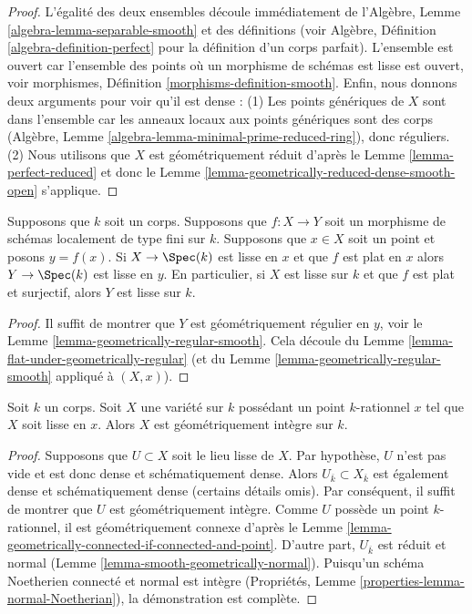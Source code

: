 \begin{proof}
L'égalité des deux ensembles découle immédiatement de
l'Algèbre, Lemme \ref{algebra-lemma-separable-smooth} et des
définitions (voir Algèbre, Définition
\ref{algebra-definition-perfect} pour la définition d'un corps
parfait). L'ensemble est ouvert car l'ensemble des points où un
morphisme de schémas est lisse est ouvert, voir morphismes,
Définition \ref{morphisms-definition-smooth}. Enfin, nous donnons
deux arguments pour voir qu'il est dense : (1) Les points génériques
de $X$ sont dans l'ensemble car les anneaux locaux aux points
génériques sont des corps (Algèbre, Lemme
\ref{algebra-lemma-minimal-prime-reduced-ring}), donc réguliers. (2) Nous
utilisons que $X$ est géométriquement réduit d'après le Lemme
\ref{lemma-perfect-reduced} et donc le Lemme \ref{lemma-geometrically-reduced-dense-smooth-open} s'applique.
\end{proof}

\begin{lemma}
\label{lemma-flat-under-smooth}
Supposons que $k$ soit un corps. Supposons que $f : X \to Y$ soit un morphisme
de schémas localement de type fini sur $k$. Supposons que $x \in X$ soit un
point et posons $y = f(x)$. Si $X \to \Spec(k)$ est lisse en $x$ et que $f$ est
plat en $x$ alors $Y \to \Spec(k)$ est lisse en $y$. En particulier, si $X$
est lisse sur $k$ et que $f$ est plat et surjectif, alors $Y$ est lisse sur $k$.
\end{lemma}

\begin{proof}
Il suffit de montrer que $Y$ est
géométriquement régulier en $y$, voir
le Lemme
\ref{lemma-geometrically-regular-smooth}. Cela
découle du Lemme
\ref{lemma-flat-under-geometrically-regular} (et du Lemme
\ref{lemma-geometrically-regular-smooth} appliqué à $(X, x)$).
\end{proof}

\begin{lemma}
\label{lemma-variety-with-smooth-rational-point}
Soit $k$ un corps. Soit $X$ une variété sur $k$
possédant un point $k$-rationnel $x$ tel que $X$ soit
lisse en $x$. Alors $X$ est géométriquement intègre sur $k$.
\end{lemma}

\begin{proof}
Supposons que $U \subset X$ soit le lieu lisse de $X$. Par
hypothèse, $U$ n'est pas vide et est donc dense et
schématiquement dense. Alors $U_{\overline{k}} \subset
X_{\overline{k}}$ est également dense et schématiquement dense
(certains détails omis). Par conséquent, il suffit de montrer
que $U$ est géométriquement intègre. Comme $U$ possède un point
$k$-rationnel, il est géométriquement connexe d'après le Lemme
\ref{lemma-geometrically-connected-if-connected-and-point}.
D'autre part, $U_{\overline{k}}$ est réduit et normal (Lemme
\ref{lemma-smooth-geometrically-normal}). Puisqu'un schéma
Noetherien connecté et normal est intègre (Propriétés, Lemme
\ref{properties-lemma-normal-Noetherian}), la démonstration est complète.
\end{proof}

